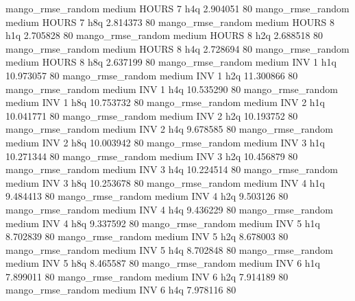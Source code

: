 mango_rmse_random     medium    HOURS                 7                  h4q  2.904051 80
mango_rmse_random     medium    HOURS                 7                  h8q  2.814373 80
mango_rmse_random     medium    HOURS                 8                  h1q  2.705828 80
mango_rmse_random     medium    HOURS                 8                  h2q  2.688518 80
mango_rmse_random     medium    HOURS                 8                  h4q  2.728694 80
mango_rmse_random     medium    HOURS                 8                  h8q  2.637199 80
mango_rmse_random     medium      INV                 1                  h1q 10.973057 80
mango_rmse_random     medium      INV                 1                  h2q 11.300866 80
mango_rmse_random     medium      INV                 1                  h4q 10.535290 80
mango_rmse_random     medium      INV                 1                  h8q 10.753732 80
mango_rmse_random     medium      INV                 2                  h1q 10.041771 80
mango_rmse_random     medium      INV                 2                  h2q 10.193752 80
mango_rmse_random     medium      INV                 2                  h4q  9.678585 80
mango_rmse_random     medium      INV                 2                  h8q 10.003942 80
mango_rmse_random     medium      INV                 3                  h1q 10.271344 80
mango_rmse_random     medium      INV                 3                  h2q 10.456879 80
mango_rmse_random     medium      INV                 3                  h4q 10.224514 80
mango_rmse_random     medium      INV                 3                  h8q 10.253678 80
mango_rmse_random     medium      INV                 4                  h1q  9.484413 80
mango_rmse_random     medium      INV                 4                  h2q  9.503126 80
mango_rmse_random     medium      INV                 4                  h4q  9.436229 80
mango_rmse_random     medium      INV                 4                  h8q  9.337592 80
mango_rmse_random     medium      INV                 5                  h1q  8.702839 80
mango_rmse_random     medium      INV                 5                  h2q  8.678003 80
mango_rmse_random     medium      INV                 5                  h4q  8.702848 80
mango_rmse_random     medium      INV                 5                  h8q  8.465587 80
mango_rmse_random     medium      INV                 6                  h1q  7.899011 80
mango_rmse_random     medium      INV                 6                  h2q  7.914189 80
mango_rmse_random     medium      INV                 6                  h4q  7.978116 80
